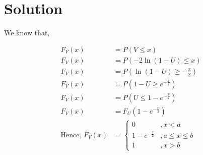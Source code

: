 \documentclass[16pt, a4paper, two column]{article}
\begin{document}
\section*{Solution}
We know that,

\begin{align}
	F_V(x) &= P(V \leq x) \\
	F_V(x) &= P(-2 \ln(1-U) \leq x) \\
	F_V(x) &= P(\ln(1-U) \geq -\frac{x}{2}) \\
	F_V(x) &= P(1-U \geq e^{-\frac{x}{2}}) \\
	F_V(x) &= P(U \leq 1-e^{-\frac{x}{2}}) \\
	F_V(x) &= F_U(1-e^{-\frac{x}{2}}) \\
	\text{Hence, } F_V(x) &= \begin{cases} 0 &, x < a \\
	1-e^{-\frac{x}{2}} &, a \leq x \leq b \\
	1 &, x > b \end{cases}
\end{align}
\end{document}
